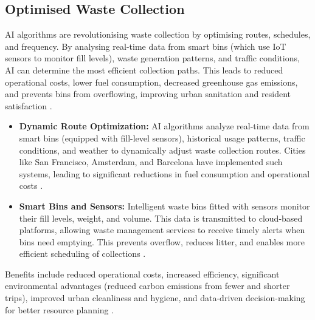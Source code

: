 \subsection{Optimised Waste Collection}
AI algorithms are revolutionising waste collection by optimising routes, schedules, and frequency. By analysing real-time data from smart bins (which use IoT sensors to monitor fill levels), waste generation patterns, and traffic conditions, AI can determine the most efficient collection paths. This leads to reduced operational costs, lower fuel consumption, decreased greenhouse gas emissions, and prevents bins from overflowing, improving urban sanitation and resident satisfaction \cite{fang2023artificial}.
\begin{itemize}
    \item \textbf{Dynamic Route Optimization:} AI algorithms analyze real-time data from smart bins (equipped with fill-level sensors), historical usage patterns, traffic conditions, and weather to dynamically adjust waste collection routes. Cities like San Francisco, Amsterdam, and Barcelona have implemented such systems, leading to significant reductions in fuel consumption and operational costs \cite{GlobalTrashSolutions_Collection, DVOTeam_Collection}.
    \item \textbf{Smart Bins and Sensors:} Intelligent waste bins fitted with sensors monitor their fill levels, weight, and volume. This data is transmitted to cloud-based platforms, allowing waste management services to receive timely alerts when bins need emptying. This prevents overflow, reduces litter, and enables more efficient scheduling of collections \cite{EffectualServices_Collection}.
\end{itemize}
Benefits include reduced operational costs, increased efficiency, significant environmental advantages (reduced carbon emissions from fewer and shorter trips), improved urban cleanliness and hygiene, and data-driven decision-making for better resource planning \cite{ITU_Collection, Medium_Collection}.

